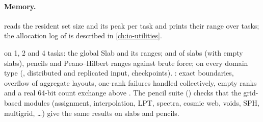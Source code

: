 \paragraph*{Memory.}  reads the resident set size and its peak per task and prints their range over
tasks; the allocation log of  is described in \cref{ch:io-utilities}.

\begin{validation}
 on 1, 2 and 4 tasks: the global Slab and its ranges;  and  of
slabs (with empty slabs), pencils and Peano--Hilbert ranges against brute force;  on every domain type
(, distributed and replicated input, checkpoints). : exact
 boundaries, overflow of aggregate layouts, one-rank failures handled collectively, empty ranks and a real
64-bit count exchange above . The pencil suite () checks that the grid-based
modules (assignment, interpolation, LPT, spectra, cosmic web, voids, SPH, multigrid, \ldots) give the same results on slabs
and pencils.
\end{validation}
